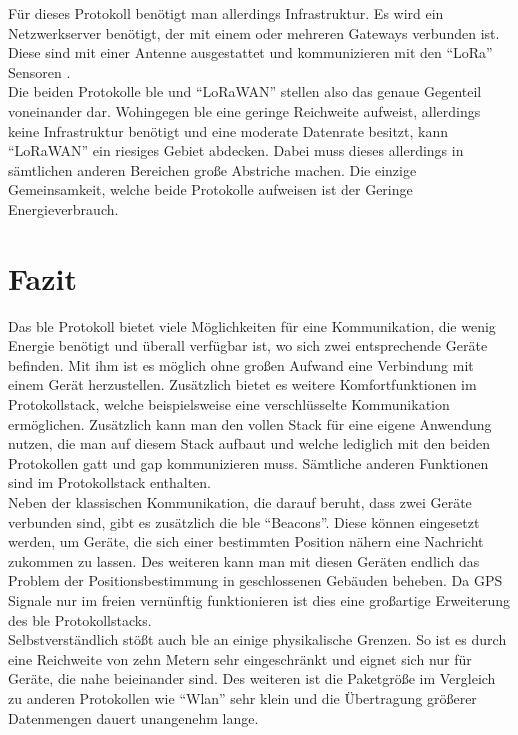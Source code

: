 \noindent Für dieses Protokoll benötigt man allerdings Infrastruktur. Es wird ein Netzwerkserver benötigt, der mit einem oder mehreren Gateways verbunden ist. Diese sind mit einer Antenne ausgestattet und kommunizieren mit den "`LoRa"' Sensoren \cite{LO:WWW}.\\

\noindent Die beiden Protokolle \ac{ble} und "`LoRaWAN"' stellen also das genaue Gegenteil voneinander dar. Wohingegen \ac{ble} eine geringe Reichweite aufweist, allerdings keine Infrastruktur benötigt und eine moderate Datenrate besitzt, kann "`LoRaWAN"' ein riesiges Gebiet abdecken. Dabei muss dieses allerdings in sämtlichen anderen Bereichen große Abstriche machen. Die einzige Gemeinsamkeit, welche beide Protokolle aufweisen ist der Geringe Energieverbrauch.\\ 

\section{Fazit}
\label{s:fazit}

Das \ac{ble} Protokoll bietet viele Möglichkeiten für eine Kommunikation, die wenig Energie benötigt und überall verfügbar ist, wo sich zwei entsprechende Geräte befinden. Mit ihm ist es möglich ohne großen Aufwand eine Verbindung mit einem Gerät herzustellen. Zusätzlich bietet es weitere Komfortfunktionen im Protokollstack, welche beispielsweise eine verschlüsselte Kommunikation ermöglichen. Zusätzlich kann man den vollen Stack für eine eigene Anwendung nutzen, die man auf diesem Stack aufbaut und welche lediglich mit den beiden Protokollen \ac{gatt} und \ac{gap} kommunizieren muss. Sämtliche anderen Funktionen sind im Protokollstack enthalten.\\

\noindent Neben der klassischen Kommunikation, die darauf beruht, dass zwei Geräte verbunden sind, gibt es zusätzlich die \ac{ble} "`Beacons"'. Diese können eingesetzt werden, um Geräte, die sich einer bestimmten Position nähern eine Nachricht zukommen zu lassen. Des weiteren kann man mit diesen Geräten endlich das Problem der Positionsbestimmung in geschlossenen Gebäuden beheben. Da GPS Signale nur im freien vernünftig funktionieren ist dies eine großartige Erweiterung des \ac{ble} Protokollstacks.\\

\noindent Selbstverständlich stößt auch \ac{ble} an einige physikalische Grenzen. So ist es durch eine Reichweite von zehn Metern sehr eingeschränkt und eignet sich nur für Geräte, die nahe beieinander sind. Des weiteren ist die Paketgröße im Vergleich zu anderen Protokollen wie "`Wlan"' sehr klein und die Übertragung größerer Datenmengen dauert unangenehm lange.\\

